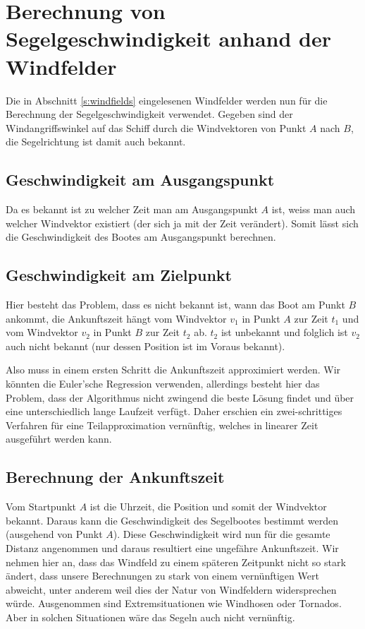 
\section{Berechnung von Segelgeschwindigkeit anhand der Windfelder}
Die in Abschnitt \ref{s:windfields} eingelesenen Windfelder werden nun für die
Berechnung der Segelgeschwindigkeit verwendet. Gegeben sind der
Windangriffswinkel auf das Schiff durch die Windvektoren von Punkt $A$ nach
$B$, die Segelrichtung ist damit auch bekannt.

 
\subsection{Geschwindigkeit am Ausgangspunkt}
Da es bekannt ist zu welcher Zeit man am Ausgangspunkt $A$ ist, weiss man auch
welcher Windvektor existiert (der sich ja mit der Zeit verändert). Somit lässt
sich die Geschwindigkeit des Bootes am Ausgangspunkt berechnen.

\subsection{Geschwindigkeit am Zielpunkt}
Hier besteht das Problem, dass es nicht bekannt ist, wann das Boot am Punkt $B$
ankommt, die Ankunftszeit hängt vom Windvektor $v_{1}$ in Punkt $A$ zur Zeit
$t_{1}$ und vom Windvektor $v_{2}$ in Punkt $B$ zur Zeit $t_{2}$ ab. $t_{2}$
ist unbekannt und folglich ist $v_{2}$ auch nicht bekannt (nur dessen Position
ist im Voraus bekannt).

Also muss in einem ersten Schritt die Ankunftszeit approximiert werden.  Wir
könnten die Euler'sche Regression verwenden, allerdings besteht hier das
Problem, dass der Algorithmus nicht zwingend die beste Lösung findet und über
eine unterschiedlich lange Laufzeit verfügt. Daher erschien ein zwei-schrittiges
Verfahren für eine Teilapproximation vernünftig, welches in linearer Zeit
ausgeführt werden kann.

\subsection{Berechnung der Ankunftszeit}
Vom Startpunkt $A$ ist die Uhrzeit, die Position und somit der Windvektor
bekannt. Daraus kann die Geschwindigkeit des Segelbootes bestimmt werden
(ausgehend von Punkt $A$). Diese Geschwindigkeit wird nun für die gesamte
Distanz angenommen und daraus resultiert eine ungefähre Ankunftszeit. Wir
nehmen hier an, dass das Windfeld zu einem späteren Zeitpunkt nicht so stark
ändert, dass unsere Berechnungen zu stark von einem vernünftigen Wert
abweicht, unter anderem weil dies der Natur von Windfeldern widersprechen
würde.  Ausgenommen sind Extremsituationen wie Windhosen oder Tornados. Aber
in solchen Situationen wäre das Segeln auch nicht vernünftig.

